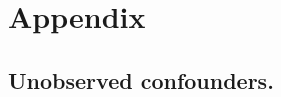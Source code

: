 
\setcounter{section}{0}
\setcounter{equation}{0}

\renewcommand{\theequation}{A\arabic{equation}}
\renewcommand{\thesection}{\Alph{section}}

\renewcommand{\thethm}{A\arabic{thm}}
\renewcommand{\thedefn}{A\arabic{defn}}
\renewcommand{\theeg}{A\arabic{eg}}

\section{Appendix}


\subsection{Unobserved confounders.}
\label{sec:confounded}


